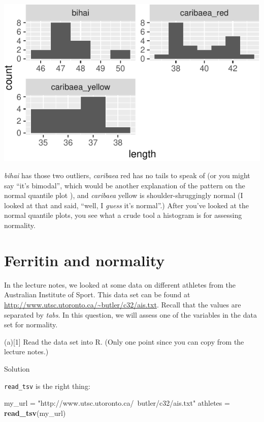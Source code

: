 \documentclass[]{tufte-book}
\newenvironment{Shaded}{}{}
\newcommand{\KeywordTok}[1]{\textcolor[rgb]{0.00,0.44,0.13}{\textbf{#1}}}
\newcommand{\NormalTok}[1]{#1}
\newcommand{\StringTok}[1]{\textcolor[rgb]{0.25,0.44,0.63}{#1}}
\theoremstyle{definition}
\theoremstyle{definition}
\theoremstyle{definition}
\theoremstyle{remark}
\begin{document}
\includegraphics{09-normal-quantile_files/figure-latex/unnamed-chunk-10-1}

\emph{bihai} has those two outliers, \emph{caribaea} red has no tails to
speak of (or you might say ``it's bimodal'', which would be another
explanation of the pattern on the normal quantile plot
),
and \emph{caribaea} yellow is shoulder-shruggingly normal (I looked at
that and said, ``well, I \emph{guess} it's normal''.) After you've
looked at the normal quantile plots, you see what a crude tool a
histogram is for assessing normality.

\hypertarget{ferritin-and-normality}{%
\section{Ferritin and normality}\label{ferritin-and-normality}}

In the lecture notes, we looked at some data on different athletes from
the Australian Institute of Sport. This data set can be found at
\url{http://www.utsc.utoronto.ca/~butler/c32/ais.txt}. Recall that the
values are separated by \emph{tabs}. In this question, we will assess
one of the variables in the data set for normality.

(a){[}1{]} Read the data set into R. (Only one point since you can copy
from the lecture notes.)

Solution

\texttt{read\_tsv} is the right thing:

\begin{Shaded}
\begin{Highlighting}[]
\NormalTok{my_url =}\StringTok{ "http://www.utsc.utoronto.ca/~butler/c32/ais.txt"}
\NormalTok{athletes =}\StringTok{ }\KeywordTok{read_tsv}\NormalTok{(my_url)}
\end{Highlighting}
\end{Shaded}
\end{document}

